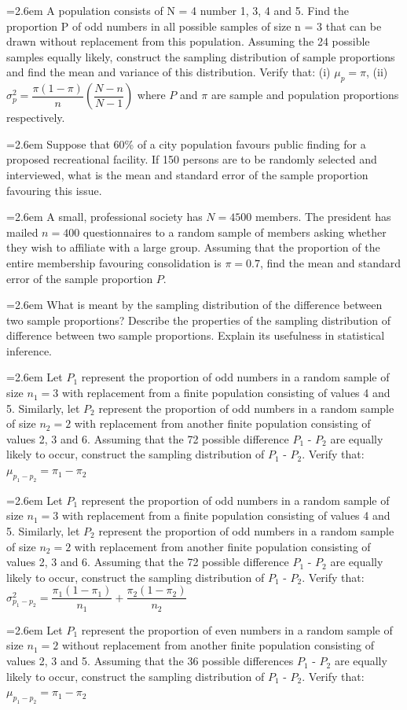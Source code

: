 \documentclass[11pt,a4paper]{article}
\newcommand{\Q}[2]{\par\smallskip\noindent\hangindent=2.6em\hangafter=1
  \makebox[2.6em][l]{\textbf{#1.}}#2\par}
\begin{document}
\Q{108}{A population consists of N = 4 number 1, 3, 4 and 5. Find the proportion P of odd numbers in all possible samples of size n = 3 that can be drawn without replacement from this population. Assuming the 24 possible samples equally likely, construct the sampling distribution of sample proportions and find the mean and variance of this distribution. Verify that: (i) $\mu_{p}=\pi$, (ii) $\sigma^{2}_{p}=\dfrac{\pi(1-\pi)}{n}\left(\dfrac{N-n}{N-1}\right)$ where $P$ and $\pi$ are sample and population proportions respectively.}
\Q{109}{Suppose that 60\% of a city population favours public finding for a proposed recreational facility. If 150 persons are to be randomly selected and interviewed, what is the mean and standard error of the sample proportion favouring this issue.}
\Q{110}{A small, professional society has $N=4500$ members. The president has mailed $n=400$ questionnaires to a random sample of members asking whether they wish to affiliate with a large group. Assuming that the proportion of the entire membership favouring consolidation is $\pi=0.7$, find the mean and standard error of the sample proportion $P$.}
\Q{111}{What is meant by the sampling distribution of the difference between two sample proportions? Describe the properties of the sampling distribution of difference between two sample proportions. Explain its usefulness in statistical inference.}
\Q{112}{Let $P_{1}$ represent the proportion of odd numbers in a random sample of size $n_{1}=3$ with replacement from a finite population consisting of values 4 and 5. Similarly, let $P_{2}$ represent the proportion of odd numbers in a random sample of size $n_{2}=2$ with replacement from another finite population consisting of values 2, 3 and 6. Assuming that the 72 possible difference $P_{1}$ - $P_{2}$ are equally likely to occur, construct the sampling distribution of $P_{1}$ - $P_{2}$. Verify that: $\mu_{p_{1}-p_{2}}=\pi_{1}-\pi_{2}$}
\Q{113}{Let $P_{1}$ represent the proportion of odd numbers in a random sample of size $n_{1}=3$ with replacement from a finite population consisting of values 4 and 5. Similarly, let $P_{2}$ represent the proportion of odd numbers in a random sample of size $n_{2}=2$ with replacement from another finite population consisting of values 2, 3 and 6. Assuming that the 72 possible difference $P_{1}$ - $P_{2}$ are equally likely to occur, construct the sampling distribution of $P_{1}$ - $P_{2}$. Verify that: $\sigma^{2}_{p_{1}-p_{2}}=\dfrac{\pi_{1}(1-\pi_{1})}{n_{1}}+\dfrac{\pi_{2}(1-\pi_{2})}{n_{2}}$}
\Q{114}{Let $P_{1}$ represent the proportion of even numbers in a random sample of size $n_{1}=2$ without replacement from another finite population consisting of values 2, 3 and 5. Assuming that the 36 possible differences $P_{1}$ - $P_{2}$ are equally likely to occur, construct the sampling distribution of $P_{1}$ - $P_{2}$. Verify that: $\mu_{p_{1}-p_{2}}=\pi_{1}-\pi_{2}$}
\end{document}
